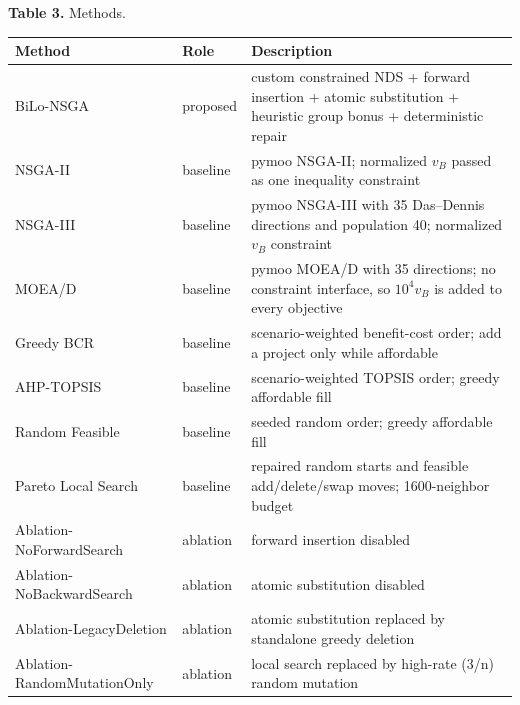 \documentclass[
]{article}
\begin{document}
\textbf{Table 3.} Methods.

\begin{longtable}[]{@{}
  >{\raggedright\arraybackslash}p{}
  >{\raggedright\arraybackslash}p{}
  >{\raggedright\arraybackslash}p{}@{}}
\toprule\noalign{}
\begin{minipage}[b]{\linewidth}\raggedright
Method
\end{minipage} & \begin{minipage}[b]{\linewidth}\raggedright
Role
\end{minipage} & \begin{minipage}[b]{\linewidth}\raggedright
Description
\end{minipage} \\
\midrule\noalign{}
\endhead
\bottomrule\noalign{}
\endlastfoot
BiLo-NSGA & proposed & custom constrained NDS + forward insertion + atomic substitution + heuristic group bonus + deterministic repair \\
NSGA-II & baseline & pymoo NSGA-II; normalized \(v_B\) passed as one inequality constraint \\
NSGA-III & baseline & pymoo NSGA-III with 35 Das--Dennis directions and population 40; normalized \(v_B\) constraint \\
MOEA/D & baseline & pymoo MOEA/D with 35 directions; no constraint interface, so \(10^4v_B\) is added to every objective \\
Greedy BCR & baseline & scenario-weighted benefit-cost order; add a project only while affordable \\
AHP-TOPSIS & baseline & scenario-weighted TOPSIS order; greedy affordable fill \\
Random Feasible & baseline & seeded random order; greedy affordable fill \\
Pareto Local Search & baseline & 40 repaired random starts and feasible add/delete/swap moves; 1600-neighbor budget \\
Ablation-NoForwardSearch & ablation & forward insertion disabled \\
Ablation-NoBackwardSearch & ablation & atomic substitution disabled \\
Ablation-LegacyDeletion & ablation & atomic substitution replaced by standalone greedy deletion \\
Ablation-RandomMutationOnly & ablation & local search replaced by high-rate (3/n) random mutation \\

\end{longtable}
\end{document}

